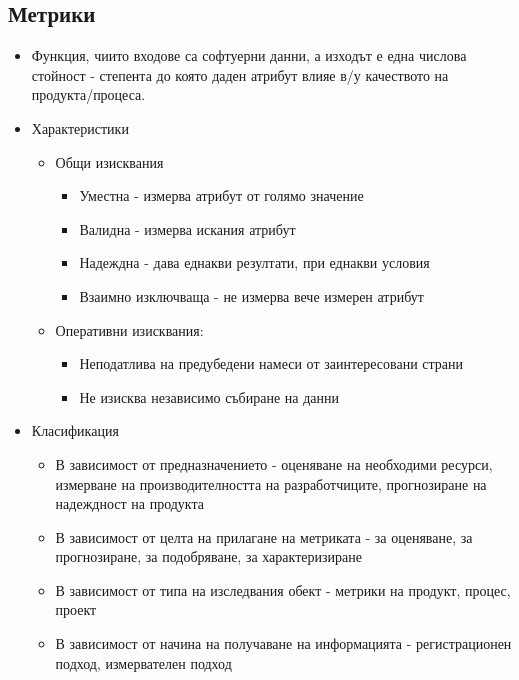 \documentclass[fleqn,12pt]{article}
\begin{document}
\begin{flushleft}
\section{Метрики}
    \begin{itemize}
        \item Функция, чиито входове са софтуерни данни, а изходът е една числова стойност - степента до която даден атрибут влияе в/у качеството на продукта/процеса.
        \item Характеристики
            \begin{itemize}
                \item Общи изисквания
                    \begin{itemize}
                        \item Уместна - измерва атрибут от голямо значение
                      \item Валидна - измерва искания атрибут
                        \item Надеждна - дава еднакви резултати, при еднакви условия
                        \item Взаимно изключваща - не измерва вече измерен атрибут
                   \end{itemize}
                \item Оперативни изисквания:
                \begin{itemize}
                    \item Неподатлива на предубедени намеси от заинтересовани страни
                    \item Не изисква независимо събиране на данни
                \end{itemize}
            \end{itemize}
        \item Класификация
            \begin{itemize}
                \item В зависимост от предназначението - оценяване на необходими ресурси, измерване на производителността на разработчиците, прогнозиране на надеждност на продукта
                \item В зависимост от целта на прилагане на метриката - за оценяване, за прогнозиране, за подобряване, за характеризиране
                \item В зависимост от типа на изследвания обект - метрики на продукт, процес, проект
                \item В зависимост от начина на получаване на информацията - регистрационен подход, измервателен подход
            \end{itemize}
    \end{itemize}


\end{flushleft}
\end{document}
